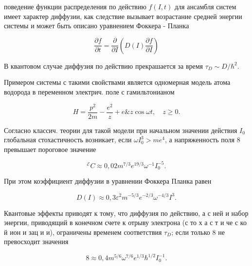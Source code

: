 \documentclass[10pt]{article}
\begin{document}
поведение функции распределения по действию $f(I, t)$ для ансамбля систем имеет характер диффузии, как следствие вызывает возрастание средней энергии системы и может быть описано уравнением Фоккера - Планка



\[

\frac{\partial f}{\partial t}=\frac{\partial}{\partial I}\left(D(I) \frac{\partial f}{\partial I}\right)

\]



В квантовом случае диффузия по действию прекрашается за время $\tau_{D} \sim D / \hbar^{2}$.



Примером системы с такими свойствами является одномерная модель атома водорода в переменном электрич. поле с гамильтонианом



\[

H=\frac{p^{2}}{2 m}-\frac{e^{2}}{z}+e \& z \cos \omega t, \quad z \geqslant 0 .

\]



Согласно классич. теории для такой модели при начальном значении действия $I_{0}$ глобальная стохастичность возникает, если $\omega I_{0}^{3}>m e^{4}$, а напряженность поля $\mathscr{8}$ превышает пороговое значение



\[

{ }^{\mathscr{E}} C \approx 0,02 m^{7 / 3} e^{19 / 3} \omega^{-1} I_{0}^{-5} .

\]



При этом коэффициент диффузии в уравнении Фоккера Планка равен



\[

D(I) \approx 0,3 \mathscr{\varepsilon}^{2} m^{-5 / 3} e^{-2 / 3} \omega^{-4 / 3} I^{3} .

\]



Квантовые эффекты приводят к тому, что диффузия по действию, а с ней и набор энергии, приводящий в конечном счете к отрыву электрона (с то х а с т и че с ко й ион и зац и и), ограничены временем соответствия $\tau_{D}$; если только 8 не превосходит значения



\[

8 \approx 0,4 m^{5 / 6} \omega^{7 / 6} e^{1 / 3} \hbar^{1 / 2} I_{0}^{-1} .

\]
\end{document}

